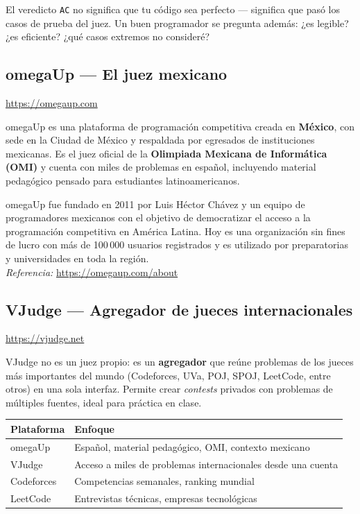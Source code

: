 \documentclass[12pt, oneside]{article}
\begin{document}
\begin{recuerda}
  El veredicto \texttt{AC} no significa que tu código sea perfecto — significa
  que pasó los casos de prueba del juez. Un buen programador se pregunta además:
  ¿es legible? ¿es eficiente? ¿qué casos extremos no consideré?
\end{recuerda}

\subsection{omegaUp — El juez mexicano}

\begin{center}
  \url{https://omegaup.com}
\end{center}

omegaUp es una plataforma de programación competitiva creada en \textbf{México},
con sede en la Ciudad de México y respaldada por egresados de instituciones
mexicanas. Es el juez oficial de la \textbf{Olimpiada Mexicana de Informática
(OMI)} y cuenta con miles de problemas en español, incluyendo material
pedagógico pensado para estudiantes latinoamericanos.

\begin{tecnico}
  omegaUp fue fundado en 2011 por Luis Héctor Chávez y un equipo de
  programadores mexicanos con el objetivo de democratizar el acceso a la
  programación competitiva en América Latina. Hoy es una organización sin
  fines de lucro con más de 100\,000 usuarios registrados y es utilizado por
  preparatorias y universidades en toda la región.\\
  \textit{Referencia:} \url{https://omegaup.com/about}
\end{tecnico}

\subsection{VJudge — Agregador de jueces internacionales}

\begin{center}
  \url{https://vjudge.net}
\end{center}

VJudge no es un juez propio: es un \textbf{agregador} que reúne problemas de
los jueces más importantes del mundo (Codeforces, UVa, POJ, SPOJ, LeetCode,
entre otros) en una sola interfaz. Permite crear \textit{contests} privados
con problemas de múltiples fuentes, ideal para práctica en clase.

\begin{center}
\begin{tabular}{ll}
  \toprule
  \textbf{Plataforma} & \textbf{Enfoque} \\
  \midrule
  omegaUp   & Español, material pedagógico, OMI, contexto mexicano \\
  VJudge    & Acceso a miles de problemas internacionales desde una cuenta \\
  Codeforces & Competencias semanales, ranking mundial \\
  LeetCode  & Entrevistas técnicas, empresas tecnológicas \\
  \bottomrule
\end{tabular}
\end{center}
\end{document}
